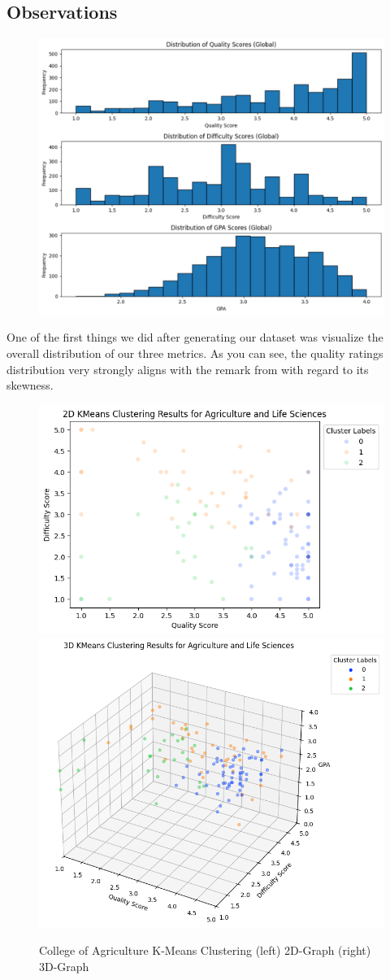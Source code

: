 \documentclass[sigconf,nonacm]{acmart}
\begin{document}
\subsection{Observations}
\begin{figure}[H]
    \centering
    \includegraphics[width=0.9\linewidth]{images/aggregate-distributions.png}
    \label{fig:enter-label}
\end{figure}

One of the first things we did after generating our dataset was visualize the overall distribution of our three metrics. As you can see, the quality ratings distribution very strongly aligns with the remark from \cite{LINSE201794:sourceE} with regard to its skewness.

\begin{figure}[H]
    \centering
    \includegraphics[width=0.45\linewidth]{images/agriculture-2d.png}
    \includegraphics[width=0.45\linewidth]{images/agriculture-3d.png}
    \caption{College of Agriculture K-Means Clustering (left) 2D-Graph (right) 3D-Graph}
    \label{fig:enter-label}
\end{figure}
\end{document}
